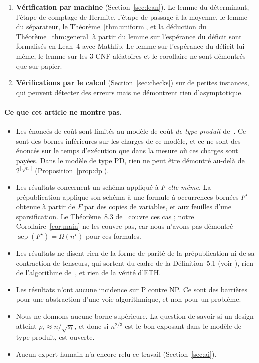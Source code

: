 \documentclass[11pt,a4paper]{article}
\theoremstyle{definition}
\theoremstyle{remark}
\newcommand{\sep}{\operatorname{sep}}
\begin{document}
\begin{enumerate}
 facture les lignes, comme le modèle de type produit.
\item \textbf{Vérification par machine} (Section~\ref{sec:lean}). Le lemme du déterminant,
 l'étape de comptage de Hermite, l'étape de passage à la moyenne, le lemme du séparateur, le
 Théorème~\ref{thm:uniform}, et la déduction du Théorème~\ref{thm:general} à partir du lemme
 sur l'espérance du déficit sont formalisés en Lean~4 avec Mathlib. Le lemme sur l'espérance
 du déficit lui-même, le lemme sur les 3-CNF aléatoires et le corollaire ne sont démontrés
 que sur papier.
\item \textbf{Vérifications par le calcul} (Section~\ref{sec:checks}) sur de petites instances,
 qui peuvent détecter des erreurs mais ne démontrent rien d'asymptotique.
\end{enumerate}

\paragraph{Ce que cet article ne montre pas.}
\begin{itemize}
\item Les énoncés de coût sont limités au modèle de coût \emph{de type produit}
 de~\cite[Section~5.2]{DL}. Ce sont des bornes inférieures sur les charges de ce modèle, et
 ce ne sont des énoncés sur le temps d'exécution que dans la mesure où ces charges sont
 payées. Dans le modèle de type PD, rien ne peut être démontré au-delà de
 $2^{\lceil\sqrt n\rceil}$ (Proposition~\ref{prop:dp}).
\item Les résultats concernent un schéma appliqué à $F$ \emph{elle-même}. La prépublication
 applique son schéma à une formule à occurrences bornées $F^\star$ obtenue à partir de $F$
 par des copies de variables, et aux feuilles d'une sparsification. Le Théorème~8.3
 de~\cite{DL} couvre ces cas ; notre Corollaire~\ref{cor:main} ne les couvre pas, car nous
 n'avons pas démontré $\sep(F^\star)=\Omega(n^\star)$ pour ces formules.
\item Les résultats ne disent rien de la forme de parité de la prépublication ni de sa
 contraction de tenseurs, qui sortent du cadre de la Définition~5.1 (voir
 \cite[Section~5.1]{DL}), rien de l'algorithme de~\cite{Claude}, et rien de la vérité d'ETH.
\item Les résultats n'ont aucune incidence sur P contre NP. Ce sont des barrières pour une
 abstraction d'une voie algorithmique, et non pour un problème.
\item Nous ne donnons aucune borne supérieure. La question de savoir si un design atteint
 $\rho_t\approx n/\sqrt{s_t}$, et donc si $n^{2/3}$ est le bon exposant dans le modèle de
 type produit, est ouverte.
\item Aucun expert humain n'a encore relu ce travail (Section~\ref{sec:ai}).
\end{itemize}
\end{document}
